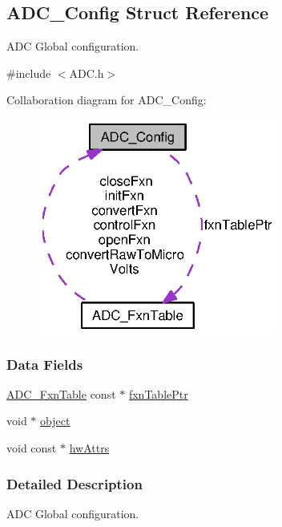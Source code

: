 \subsection{A\+D\+C\+\_\+\+Config Struct Reference}
\label{struct_a_d_c___config}


A\+D\+C Global configuration.  




{\ttfamily \#include $<$A\+D\+C.\+h$>$}



Collaboration diagram for A\+D\+C\+\_\+\+Config\+:
\nopagebreak
\begin{figure}[H]
\begin{center}
\leavevmode
\includegraphics[width=222pt]{struct_a_d_c___config__coll__graph}
\end{center}
\end{figure}
\subsubsection*{Data Fields}
\begin{DoxyCompactItemize}
\item 
\hyperlink{struct_a_d_c___fxn_table}{A\+D\+C\+\_\+\+Fxn\+Table} const $\ast$ \hyperlink{struct_a_d_c___config_a3ca1098e17a4748a0f6dc64382cea00d}{fxn\+Table\+Ptr}
\item 
void $\ast$ \hyperlink{struct_a_d_c___config_acf3784052a071ffab8a3f1dd9b334c02}{object}
\item 
void const $\ast$ \hyperlink{struct_a_d_c___config_a485e9d57b2d43a4b7dde68972f88dd2b}{hw\+Attrs}
\end{DoxyCompactItemize}


\subsubsection{Detailed Description}
A\+D\+C Global configuration. 

